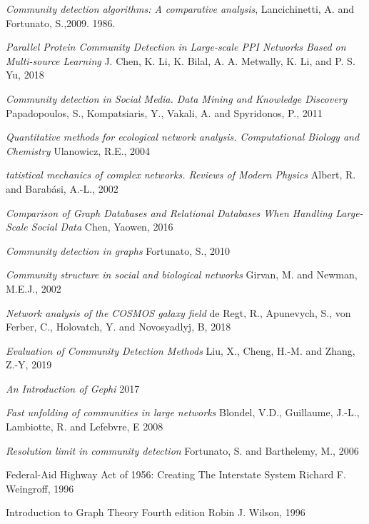 \documentclass[12pt]{article}
\begin{document}
\pagebreak
\begin{thebibliography}{100}

  
    \textit{Community detection algorithms: A comparative analysis},
    Lancichinetti, A. and Fortunato, S.,2009.
    1986.
  
    \textit{Parallel Protein Community Detection in
    Large-scale PPI Networks Based on
    Multi-source Learning}
    J. Chen, K. Li, K. Bilal, A. A. Metwally, K. Li, and P. S. Yu,
    2018
    
    \textit{Community detection in Social Media. Data Mining and Knowledge Discovery}
    Papadopoulos, S., Kompatsiaris, Y., Vakali, A. and Spyridonos, P.,
    2011
    
    \textit{Quantitative methods for ecological network analysis. Computational Biology and Chemistry}
    Ulanowicz, R.E.,
    2004
    
    \textit{tatistical mechanics of complex networks. Reviews of Modern Physics}
    Albert, R. and Barabási, A.-L.,
    2002
    
    \textit{Comparison of Graph Databases and Relational Databases When Handling Large-Scale Social Data}
    Chen, Yaowen,
    2016
    
    \textit{Community detection in graphs}
    Fortunato, S.,
    2010
    
    \textit{Community structure in social and biological networks}
    Girvan, M. and Newman, M.E.J.,
    2002
    
    \textit{Network analysis of the COSMOS galaxy field}
    de Regt, R., Apunevych, S., von Ferber, C., Holovatch, Y. and Novosyadlyj, B,
    2018
    
    \textit{Evaluation of Community Detection Methods}
    Liu, X., Cheng, H.-M. and Zhang, Z.-Y,
    2019
    
    \textit{An Introduction of Gephi}
    2017

    \textit{Fast unfolding of communities in large networks}
    Blondel, V.D., Guillaume, J.-L., Lambiotte, R. and Lefebvre, E
    2008
    
    \textit{Resolution limit in community detection}
    Fortunato, S. and Barthelemy, M.,
    2006

	{Federal-Aid Highway Act of 1956: Creating The Interstate System}
	Richard F. Weingroff,
    1996
    
   	{Introduction to Graph Theory Fourth edition }
    Robin J. Wilson,
    1996
        
\end{thebibliography}
\end{document}
